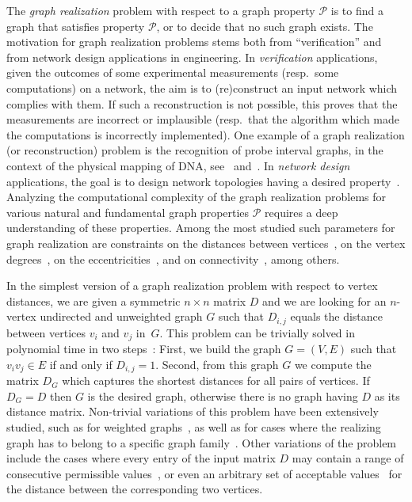 \documentclass[a4paper,UKenglish,cleveref, autoref, thm-restate, anonymous]{lipics-v2021}
\begin{document}
The \emph{graph realization} problem with respect to a graph property $\mathcal{P}$ is to find a graph that satisfies property $\mathcal{P}$, or to decide that no such graph exists. 
The motivation for graph realization problems stems both from ``verification'' and from network design applications in engineering. 
In \emph{verification} applications, given the outcomes of some experimental measurements (resp.~some computations) on a network, 
the aim is to (re)construct an input network which complies with them. 
If such a reconstruction is not possible, this proves that the measurements are incorrect or implausible (resp.~that the algorithm which made the computations is incorrectly implemented). 
One example of a graph realization (or reconstruction) problem is the recognition of probe interval graphs, in the context of the physical mapping of DNA, see~\cite{McMorris98,McConnellS02} and~\cite[Chapter 4]{GolumbicTrenk04}.
In \emph{network design} applications, the goal is to design network topologies having a desired property~\cite{augustine2022distributed,grotschel1995design}.
Analyzing the computational complexity of the graph realization problems for various natural and fundamental graph properties $\mathcal{P}$ requires a deep understanding of these properties.
Among the most studied such parameters for graph realization 
are constraints on the distances between vertices~\cite{barNoy2022GraphRealization,barNoy2021composed,hakimi1965distance,chung2001distance,bixby1988almost,culberson1989fast}, 
on the vertex degrees~\cite{GolovachM17,gomory1961multi,hakimi1962realizability,Bar-NoyCPR20,erdos1960graphs}, 
on the eccentricities~\cite{barNoy2020efficiently,hell2009linear,behzad1976eccentric,lesniak1975eccentric}, and on connectivity~\cite{fulkerson1960zero,frank1992augmenting,chen1966realization,frank1994connectivity,frank1970connectivity,gomory1961multi}, among others. 


In the simplest version of a graph realization problem with respect to vertex distances, 
we are given a symmetric $n \times n$ matrix $D$ and we are looking for an $n$-vertex undirected and unweighted graph $G$ such that $D_{i,j}$ equals the distance between vertices $v_i$ and $v_j$ in~$G$. This problem can be trivially solved in polynomial time in two steps~\cite{hakimi1965distance}: First, we build the graph $G=(V,E)$ such that $v_i v_j \in E$ if and only if $D_{i,j}=1$. Second, from this graph $G$ we compute the matrix $D_G$ which captures the shortest distances for all pairs of vertices. If $D_G = D$ then $G$ is the desired graph, otherwise there is no graph having $D$ as its distance matrix. 
Non-trivial variations of this problem have been extensively studied, such as for weighted graphs~\cite{hakimi1965distance,Patrinos-Hakimi-72}, as well as for cases where the realizing graph has to belong to a specific graph family~\cite{hakimi1965distance, barNoy2021composed}. Other variations of the problem include the cases where every entry of the input matrix $D$ may contain a range of consecutive permissible values~\cite{barNoy2021composed,Rubei16,Tamura93}, or even an arbitrary set of acceptable values~\cite{barNoy2022GraphRealization} for the distance between the corresponding two vertices. 
\end{document}
